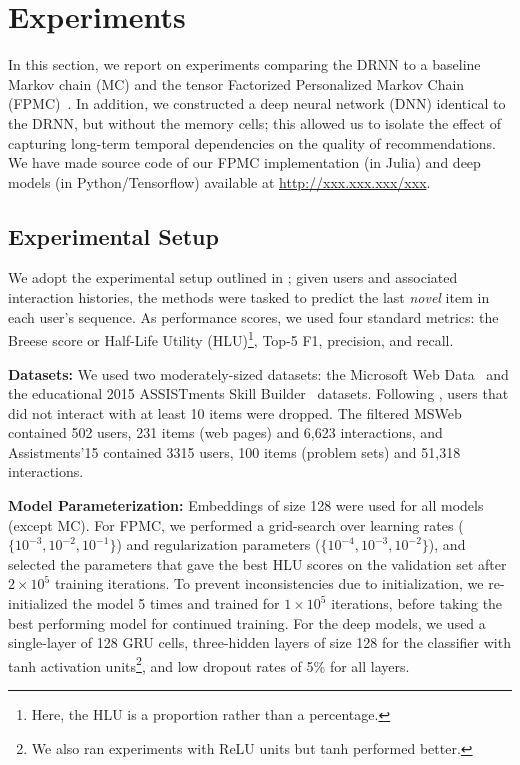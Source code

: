 \documentclass{sig-alternate-05-2015}
\begin{document}
\section{Experiments}
In this section, we report on experiments comparing the DRNN to a baseline Markov chain (MC) and the tensor Factorized Personalized Markov Chain (FPMC)~\cite{Rendle2010}. In addition, we constructed a deep neural network (DNN) identical to the DRNN, but without the memory cells; this allowed us to isolate the effect of capturing long-term temporal dependencies on the quality of recommendations. We have made source code of our FPMC implementation (in Julia) and deep models (in Python/Tensorflow) available at \url{http://xxx.xxx.xxx/xxx}.

\subsection{Experimental Setup}
We adopt the experimental setup outlined in \cite{Rendle2010};  given users and associated interaction histories, the methods were tasked to predict the last \emph{novel} item in each user's sequence. As performance scores, we used four standard metrics: the Breese score or Half-Life Utility (HLU)\footnote{Here, the HLU is a proportion rather than a percentage.}, Top-5 F1, precision, and recall. 

\vspace{2mm}
\noindent\textbf{Datasets:} We used two moderately-sized datasets: the Microsoft Web Data~\cite{Breese1998} and the educational 2015 ASSISTments Skill Builder~\cite{Assistmentsdata} datasets. Following \cite{Rendle2010}, users that did not interact with at least 10 items were dropped. The filtered MSWeb contained 502 users, 231 items (web pages) and 6,623 interactions, and  Assistments'15 contained 3315 users, 100 items (problem sets) and 51,318 interactions. 

\vspace{2mm}
\noindent\textbf{Model Parameterization:} Embeddings of size 128 were used for all models (except MC). For FPMC, we performed a grid-search over learning rates ($\{10^{-3},10^{-2},10^{-1}\}$) and regularization parameters ($\{10^{-4},10^{-3},10^{-2}\}$), and selected the parameters that gave the best HLU scores on the validation set after $2\times10^5$ training iterations. To prevent inconsistencies due to initialization, we re-initialized the model 5 times and trained for $1\times10^5$ iterations, before taking the best performing model for continued training. For the deep models, we used a single-layer of 128 GRU cells, three-hidden layers of size 128 for the classifier with tanh activation units\footnote{We also ran experiments with ReLU units but tanh performed better.}, and low dropout rates of 5\% for all layers. 
\end{document}
